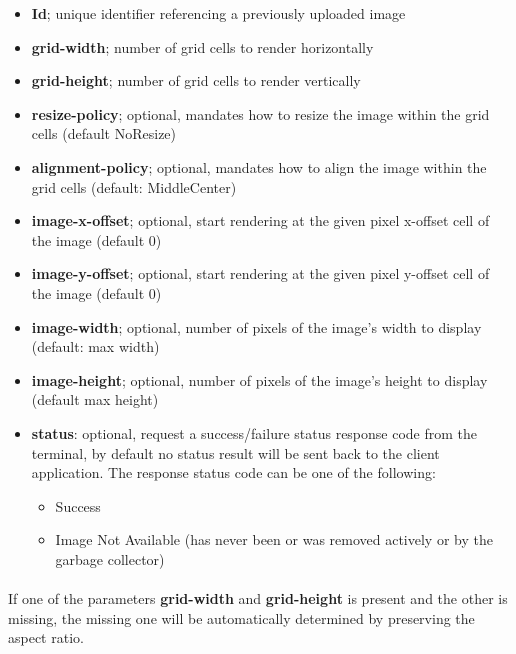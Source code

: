 \documentclass{article}
\begin{document}
\begin{itemize}
    \item \textbf{Id}; unique identifier referencing a previously uploaded image
    \item \textbf{grid-width}; number of grid cells to render horizontally
    \item \textbf{grid-height}; number of grid cells to render vertically
    \item \textbf{resize-policy}; optional, mandates how to resize the image within the grid cells (default NoResize)
    \item \textbf{alignment-policy}; optional, mandates how to align the image within the grid cells (default: MiddleCenter)
    \item \textbf{image-x-offset}; optional, start rendering at the given pixel x-offset cell of the image (default 0)
    \item \textbf{image-y-offset}; optional, start rendering at the given pixel y-offset cell of the image (default 0)
    \item \textbf{image-width}; optional, number of pixels of the image's width to display (default: max width)
    \item \textbf{image-height}; optional, number of pixels of the image's height to display (default max height)
    \item \textbf{status}: optional, request a success/failure status response code from the terminal, by default
        no status result will be sent back to the client application.
        The response status code can be one of the following:
        \begin{itemize}
            \item Success
            \item Image Not Available (has never been or was removed actively or by the garbage collector)
        \end{itemize}
\end{itemize}


\paragraph*{}
If one of the parameters \textbf{grid-width} and \textbf{grid-height} is present and the other is
missing, the missing one will be automatically determined by preserving the aspect ratio.
\end{document}
